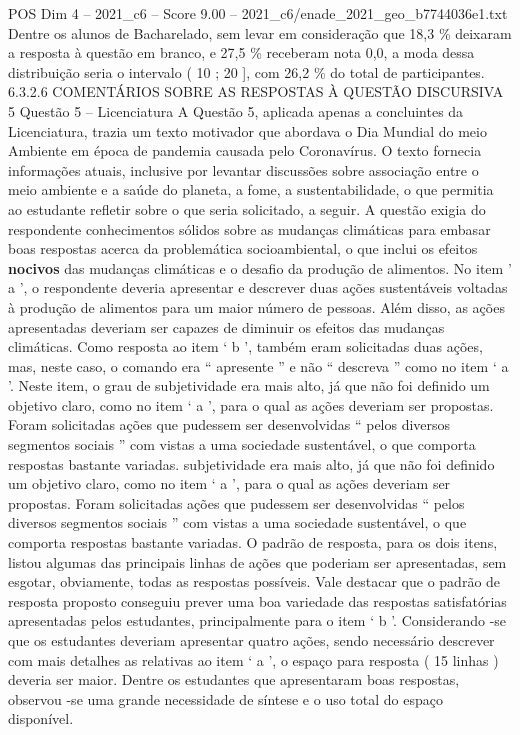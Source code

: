 \begin{textsample}{POS Dim 4 – 2021\_c6 – Score 9.00 – 2021\_c6/enade\_2021\_geo\_b7744036e1.txt}
Dentre os alunos de Bacharelado, sem levar em consideração que 18,3 \% deixaram a resposta à questão em branco, e 27,5 \% receberam nota 0,0, a moda dessa distribuição seria o intervalo ( 10 ; 20 ], com 26,2 \% do total de participantes. 6.3.2.6 COMENTÁRIOS SOBRE AS RESPOSTAS À QUESTÃO DISCURSIVA 5 Questão 5 – Licenciatura A Questão 5, aplicada apenas a concluintes da Licenciatura, trazia um texto motivador que abordava o Dia Mundial do meio Ambiente em época de pandemia causada pelo Coronavírus.
O texto fornecia informações atuais, inclusive por levantar discussões sobre associação entre o meio ambiente e a saúde do planeta, a fome, a sustentabilidade, o que permitia ao estudante refletir sobre o que seria solicitado, a seguir.
A questão exigia do respondente conhecimentos sólidos sobre as mudanças climáticas para embasar boas respostas acerca da problemática socioambiental, o que inclui os efeitos \textbf{nocivos} das mudanças climáticas e o desafio da produção de alimentos.
No item ’ a ’, o respondente deveria apresentar e descrever duas ações sustentáveis voltadas à produção de alimentos para um maior número de pessoas.
Além disso, as ações apresentadas deveriam ser capazes de diminuir os efeitos das mudanças climáticas.
Como resposta ao item ‘ b ’, também eram solicitadas duas ações, mas, neste caso, o comando era “ apresente ” e não “ descreva ” como no item ‘ a ’.
Neste item, o grau de subjetividade era mais alto, já que não foi definido um objetivo claro, como no item ‘ a ’, para o qual as ações deveriam ser propostas.
Foram solicitadas ações que pudessem ser desenvolvidas “ pelos diversos segmentos sociais ” com vistas a uma sociedade sustentável, o que comporta respostas bastante variadas. subjetividade era mais alto, já que não foi definido um objetivo claro, como no item ‘ a ’, para o qual as ações deveriam ser propostas.
Foram solicitadas ações que pudessem ser desenvolvidas “ pelos diversos segmentos sociais ” com vistas a uma sociedade sustentável, o que comporta respostas bastante variadas.
O padrão de resposta, para os dois itens, listou algumas das principais linhas de ações que poderiam ser apresentadas, sem esgotar, obviamente, todas as respostas possíveis.
Vale destacar que o padrão de resposta proposto conseguiu prever uma boa variedade das respostas satisfatórias apresentadas pelos estudantes, principalmente para o item ‘ b ’.
Considerando -se que os estudantes deveriam apresentar quatro ações, sendo necessário descrever com mais detalhes as relativas ao item ‘ a ’, o espaço para resposta ( 15 linhas ) deveria ser maior.
Dentre os estudantes que apresentaram boas respostas, observou -se uma grande necessidade de síntese e o uso total do espaço disponível.

\end{textsample}
